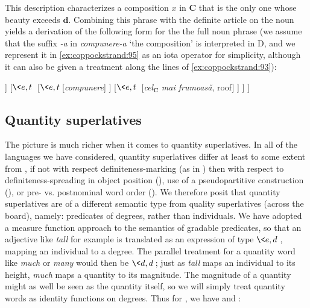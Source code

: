 \documentclass[output=paper
,modfonts
,nonflat]{langsci/langscibook}
\begin{document}
This description characterizes a composition $x$ in $\textbf{C}$ that is the only one whose beauty exceeds $\textbf{d}$. Combining this phrase with the definite article on the noun yields a derivation of the following form for the the full noun phrase (we assume that the suffix \textit{-a} in \textit{compunere-a} `the composition' is interpreted in D, and we represent it in \ref{ex:coppockstrand:95} as an iota operator for simplicity, although it can also be given a treatment along the lines of \ref{ex:coppockstrand:93}):\largerpage[2]

\ea{}\label{ex:coppockstrand:95}
\begin{forest}
	[{$e$}
		[{$\<\<\tau,t,\>,\tau\>$}[\textit{-a}]
		]
		[{$\<e,t\>$}
			[{$\<e,t\>$}[\textit{compunere}]
			]
			[{$\<e,t\>$} [\textit{cel}$_{\textbf{C}}$ \textit{mai frumoasă}, roof]
			]
		]
	]
\end{forest}\z 

\subsection{Quantity superlatives}

The picture is much richer when it comes to quantity superlatives. In all of the languages we have considered, quantity superlatives differ at least to some extent from , if not with respect definiteness-marking (as in ) then with respect to definiteness-spreading in object position (), use of a pseudopartitive construction (), or pre- vs. postnominal word order (). We therefore posit that quantity superlatives are of a different semantic type from quality superlatives (across the board), namely: predicates of degrees, rather than individuals. We have adopted a measure function approach to the semantics of gradable predicates, so that an adjective like \textit{tall} for example is translated as an expression of type $\<e,d\>$, mapping an individual to a degree. The parallel treatment for a quantity word like \textit{much} or \textit{many} would then be $\<d,d\>$; just as \textit{tall} maps an individual to its height, \textit{much} maps a quantity to its magnitude. The magnitude of a quantity might as well be seen as the quantity itself, so we will simply treat quantity words as identity functions on degrees. Thus for , we have  and : 
\end{document}
